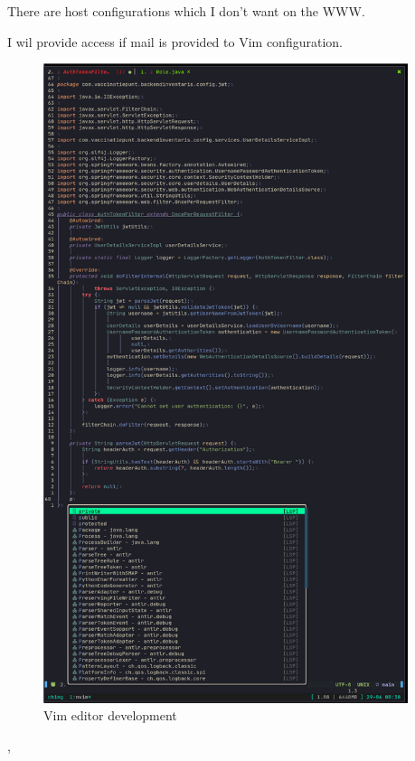 {{{			There are host configurations which I don't want on the WWW.
		}
	}
	{%
		\label{bewijs:learn}
		I wil provide access if mail is provided to Vim configuration.
		\begin{figure}
			\begin{center}
				\includegraphics[width=0.95\textwidth]{images/vim.png}
			\end{center}
			\caption{Vim editor development}
			\label{fig:vim}
		\end{figure}

	},
}
